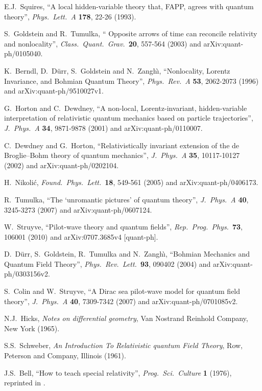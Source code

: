 \documentclass[12pt]{article}
\begin{document}
\begin{thebibliography}{10}
{E.J.\ Squires, ``A local hidden-variable theory that, FAPP, agrees with
  quantum theory'', {\em Phys.\ Lett.\ A} {\bf 178}, 22-26 (1993).}

{S.\ Goldstein and R.\ Tumulka, `` Opposite arrows of time can reconcile
  relativity and nonlocality'', {\em Class.\ Quant.\ Grav.}\ {\bf 20}, 557-564
  (2003) and arXiv:quant-ph/0105040.}


{K.\ Berndl, D.\ D\"urr, S.\ Goldstein and N.\ Zangh\`\i, ``Nonlocality,
  Lorentz Invariance, and Bohmian Quantum Theory'', {\em Phys.\ Rev.\ A} {\bf
  53}, 2062-2073 (1996) and arXiv:quant-ph/9510027v1.}

{G.\ Horton and C.\ Dewdney, ``A non-local, Lorentz-invariant, hidden-variable interpretation of relativistic quantum mechanics based on particle trajectories'', {\em J.\ Phys.\ A} {\bf 34}, 9871-9878 (2001) and arXiv:quant-ph/0110007.}

{C.\ Dewdney and G.\ Horton, ``Relativistically invariant extension of the de Broglie–Bohm theory of quantum mechanics'', {\em J.\ Phys.\ A} {\bf 35}, 10117-10127 (2002) and arXiv:quant-ph/0202104.}

{H.\ Nikoli\'c, {\em Found.\ Phys.\ Lett.}\ {\bf 18}, 549-561 (2005) and arXiv:quant-ph/0406173.}

{R.\ Tumulka, ``The `unromantic pictures' of quantum theory'', {\em J.\ Phys.\
  A} {\bf 40}, 3245-3273 (2007) and arXiv:quant-ph/0607124.}



{W.\ Struyve, ``Pilot-wave theory and quantum fields'', {\em Rep.\ Prog.\
  Phys.}\ {\bf 73}, 106001 (2010) and arXiv:0707.3685v4 [quant-ph].}

\bibitem{duerr04b}
{D.\ D\"urr, S.\ Goldstein, R.\ Tumulka and N.\ Zangh\`\i, ``Bohmian Mechanics
  and Quantum Field Theory'', {\em Phys.\ Rev.\ Lett.}\ {\bf 93}, 090402 (2004)
  and arXiv:quant-ph/0303156v2.}

{S.\ Colin and W.\ Struyve, ``A Dirac sea pilot-wave model for quantum field
  theory'', {\em J.\ Phys.\ A} {\bf 40}, 7309-7342 (2007) and
  arXiv:quant-ph/0701085v2.}

{N.J.\ Hicks, {\em Notes on differential geometry}, Van Nostrand Reinhold
  Company, New York (1965).}

{S.S.\ Schweber, {\em An Introduction To Relativistic quantum Field Theory},
  Row, Peterson and Company, Illinois (1961).}

{J.S.\ Bell, ``How to teach special relativity'', {\em Prog.\ Sci.\ Culture}
  {\bf 1} (1976), reprinted in \cite{bell87a}.}

\end{thebibliography}
\end{document}
